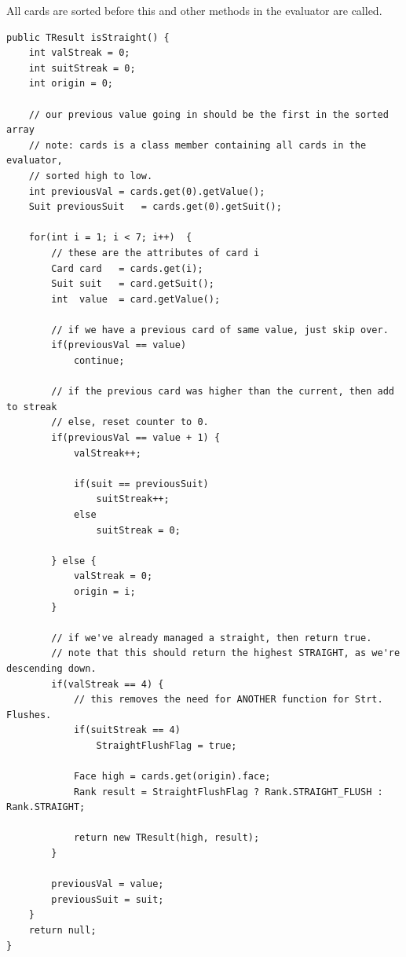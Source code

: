 \documentclass[11pt]{article}
\begin{document}
All cards are sorted before this and other methods in the evaluator are called.

\begin{lstlisting}
public TResult isStraight() {
	int valStreak = 0;
	int suitStreak = 0;
	int origin = 0;

	// our previous value going in should be the first in the sorted array
	// note: cards is a class member containing all cards in the evaluator, 
	// sorted high to low.
	int previousVal = cards.get(0).getValue();
	Suit previousSuit   = cards.get(0).getSuit();

	for(int i = 1; i < 7; i++)  {
		// these are the attributes of card i
		Card card   = cards.get(i);
		Suit suit   = card.getSuit();
		int  value  = card.getValue();

		// if we have a previous card of same value, just skip over.
		if(previousVal == value)
			continue;

		// if the previous card was higher than the current, then add to streak
		// else, reset counter to 0.
		if(previousVal == value + 1) {
			valStreak++;

			if(suit == previousSuit)
				suitStreak++;
			else
				suitStreak = 0;

		} else {
			valStreak = 0;
			origin = i;
		}

		// if we've already managed a straight, then return true.
		// note that this should return the highest STRAIGHT, as we're descending down.
		if(valStreak == 4) {
			// this removes the need for ANOTHER function for Strt. Flushes.
			if(suitStreak == 4)
				StraightFlushFlag = true;

			Face high = cards.get(origin).face;
			Rank result = StraightFlushFlag ? Rank.STRAIGHT_FLUSH : Rank.STRAIGHT;

			return new TResult(high, result);
		}

		previousVal = value;
		previousSuit = suit;
	}
	return null;
}
\end{lstlisting}
\newpage
\end{document}
